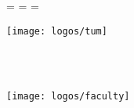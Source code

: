 \begin{titlepage}
  \oddsidemargin=\evensidemargin\relax
  \textwidth=\dimexpr{}\evensidemargin-2in\relax
  \hsize=\textwidth\relax

  \centering

  \vspace{40mm}
  \texttt{[image: logos/tum]}

  \vspace{5mm}
  {\huge\MakeUppercase{\getFaculty{}}}\\

  \vspace{5mm}
  {\large\MakeUppercase{\getUniversity{}}}\\

  \vspace{20mm}
  {\Large \getDoctype{}}

  \vspace{15mm}
  {\huge\bfseries \getTitle{}}

  \vspace{15mm}
  {\LARGE \getAuthor{}}

  \vspace{5mm}
  \texttt{[image: logos/faculty]}
\end{titlepage}
